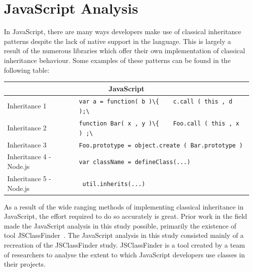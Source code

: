 \documentclass[11pt
              , a4paper
              , twoside
              , openright
              ]{report}
\newcommand{\code}[1]{\lstinline[language=code]{#1}}
\providecommand{\DIFaddend}{} %
\begin{document}
\DIFaddend \section{JavaScript Analysis}
In JavaScript, there are many ways developers make use of classical inheritance patterns despite the lack of native support in the language. This is largely a result of the numerous libraries which offer their own implementation of classical inheritance behaviour. Some examples of these patterns can be found in the following table:
\begin{center}
	\begin{tabular}{|p{5cm}|p{9cm}|}
		\hline
		\multicolumn{2}{|c|}{JavaScript}                                                                                                                                                                  \\ \hline
		Inheritance 1                  & \code{var a = function( b )\{    c.call ( this , d );\}}                                                                                      \\ \hline
		Inheritance 2                  & \code{function Bar( x , y )\{    Foo.call ( this , x ) ;\}}                                                                                 \\ \hline
		Inheritance 3                  & \code{Foo.prototype = object.create ( Bar.prototype )}                                                                                      \\ \hline
		Inheritance 4 - Node.js        & \code{var className = defineClass(...)}                                                                                                           \\ \hline
		Inheritance 5 - Node.js        & \code{ util.inherits(...)}                                                                                                                         \\ \hline
	\end{tabular}\newline\newline
\end{center}

As a result of the wide ranging methods of implementing classical inheritance in JavaScript, the effort required to do so accurately is great. Prior work in the field made the JavaScript analysis in this study possible, primarily the existence of tool JSClassFinder~\cite{JSClassFinder}. The JavaScript analysis in this study consisted mainly of a recreation of the JSClassFinder study. JSClassFinder is a tool created by a team of researchers to analyse the extent to which JavaScript developers use classes in their projects.
\end{document}
